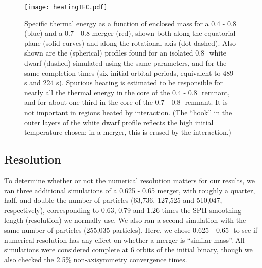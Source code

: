\begin{figure}
\centering
\texttt{[image: heatingTEC.pdf]}
\caption{Specific thermal energy as a function of enclosed mass for a 0.4 - 0.8 {\Msun} (blue) and a 0.7 - 0.8 {\Msun} merger (red), shown both along the equatorial plane (solid curves) and along the rotational axis (dot-dashed).  Also shown are the (spherical) profiles found for an isolated 0.8\,\Msun\ white dwarf (dashed) simulated using the same parameters, and for the same completion times (six initial orbital periods, equivalent to 489 s and 224 s).  Spurious heating is estimated to be responsible for nearly all the thermal energy in the core of the 0.4 - 0.8\,\Msun\ remnant, and for about one third in the core of the 0.7 - 0.8\,\Msun\ remnant.  It is not important in regions heated by interaction.  (The ``hook'' in the outer layers of the white dwarf profile reflects the high initial temperature chosen; in a merger, this is erased by the interaction.)}
\label{fig:heating}
\end{figure}

\subsection{Resolution}
\label{ssec:restest}


To determine whether or not the numerical resolution matters for our results, we ran three additional simulations of a 0.625 - 0.65 {\Msun} merger, with roughly a quarter, half, and double the number of particles (63,736, 127,525 and 510,047, respectively), corresponding to 0.63, 0.79 and 1.26 times the SPH smoothing length (resolution) we normally use.  We also ran a second simulation with the same number of particles (255,035 particles).  Here, we chose 0.625 - 0.65\,\Msun\ to see if numerical resolution has any effect on whether a merger is ``similar-mass''.  All simulations were considered complete at 6 orbits of the initial binary, though we also checked the 2.5\% non-axisymmetry convergence times.

